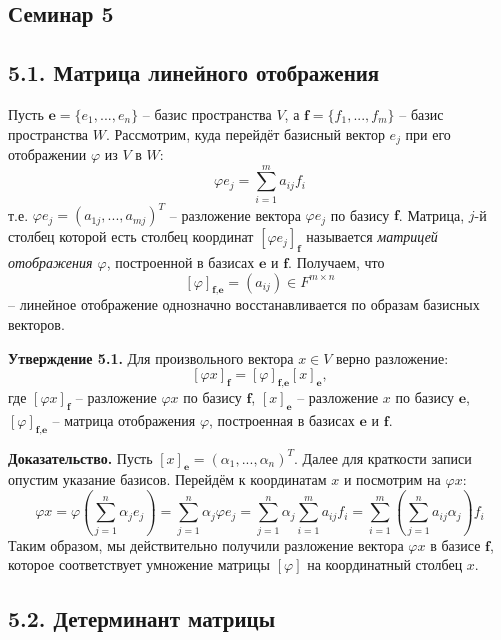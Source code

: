 \documentclass[a4paper, 12pt]{article}
\begin{document}
\begin{spacing}{1.5}
\setlength{\parindent}{0ex}

\section*{Семинар 5}


\subsection*{5.1. Матрица линейного отображения}

Пусть $\textbf{e} = \{e_1, ... , e_n\}$ -- базис пространства $V$, а $\textbf{f} = \{ f_1, ... , f_m\}$ -- базис пространства $W$. Рассмотрим, куда перейдёт базисный вектор $e_j$ при его отображении $\varphi$ из $V$ в $W$:
$$\varphi e_j = \sum_{i=1}^m a_{ij} f_i$$
т.е. $\varphi e_j = (a_{1j}, ... , a_{mj})^T$ -- разложение вектора $\varphi e_j$ по базису $\textbf{f}$. Матрица, $j$-й столбец которой есть столбец координат $[\varphi e_j]_{\textbf{f}}$ называется \textit{матрицей отображения $\varphi$}, построенной в базисах $\textbf{e}$ и $\textbf{f}$. Получаем, что
$$[\varphi]_{\textbf{f,e}} = (a_{ij}) \in F^{m \times n}$$
-- линейное отображение однозначно восстанавливается по образам базисных векторов.

\textbf{Утверждение 5.1.} Для произвольного вектора $x \in V$ верно разложение:
$$[\varphi x]_{\textbf{f}} = [\varphi]_{\textbf{f,e}} [x]_{\textbf{e}},$$
где $[\varphi x]_{\textbf{f}}$ -- разложение $\varphi x$ по базису $\textbf{f}$, $[x]_{\textbf{e}}$ -- разложение $x$ по базису $\textbf{e}$, $[\varphi]_{\textbf{f,e}}$ -- матрица отображения $\varphi$, построенная в базисах $\textbf{e}$ и $\textbf{f}$.

\textbf{Доказательство.} Пусть $[x]_{\textbf{e}}= (\alpha_1, ..., \alpha_n)^T$. Далее для краткости записи опустим указание базисов. Перейдём к координатам $x$ и посмотрим на $\varphi x$:
$$\varphi x = \varphi \left ( \sum_{j=1}^n \alpha_j e_j \right ) = \sum_{j=1}^n \alpha_j \varphi e_j = \sum_{j=1}^n \alpha_j \sum_{i=1}^m a_{ij} f_i = \sum_{i=1}^m \left( \sum_{j=1}^n a_{ij} \alpha_j \right) f_i $$
Таким образом, мы действительно получили разложение вектора $\varphi x$ в базисе $\textbf{f}$, которое соответствует умножение матрицы $[\varphi]$ на координатный столбец $x$.


\subsection*{5.2. Детерминант матрицы}


\end{spacing}
\end{document}

